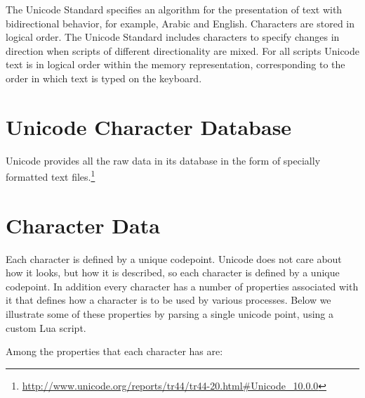 The Unicode Standard specifies an algorithm for the presentation of text with bidirectional behavior, for example, Arabic and English. Characters are stored in logical order. The Unicode Standard includes characters to specify changes in direction when scripts of different directionality are mixed. For all scripts Unicode text is in logical order within the memory representation, corresponding to the order in which text is typed on the keyboard.


\section{Unicode Character Database}

Unicode provides all the raw data in its database in the form of specially formatted text files.\footnote{\url{http://www.unicode.org/reports/tr44/tr44-20.html\#Unicode_10.0.0}}

\newfontfamily{}

\section{Character Data}

Each character is defined by a unique codepoint. Unicode does not care about how it looks, but how it is described, so each character is defined by a unique codepoint.  In addition every character has a number of properties associated with it that defines how a character is to be used by various processes. Below we illustrate some of these properties by parsing a single unicode point, using a custom Lua script.

\bgroup
\parindent=0pt
\begin{multicols}{2}
\small
\panuni
{}
\end{multicols}
\egroup


Among the properties that each character has are:

